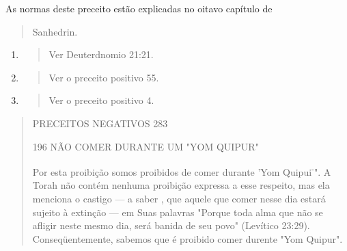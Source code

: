 As normas deste preceito estão explicadas no oitavo capítulo de

\begin{quote}
Sanhedrin.
\end{quote}

\begin{enumerate}
\def\labelenumi{\arabic{enumi}.}
\setcounter{enumi}{365}
\item
  \begin{quote}
  Ver Deuterdnomio 21:21.
  \end{quote}
\item
  \begin{quote}
  Ver o preceito positivo 55.
  \end{quote}
\item
  \begin{quote}
  Ver o preceito positivo 4.
  \end{quote}
\end{enumerate}

\begin{quote}
PRECEITOS NEGATIVOS 283

196 NÃO COMER DURANTE UM "YOM QUIPUR"

Por esta proibição somos proibidos de comer durante 'Yom
Qui­pui\textsuperscript{-}". A Torah não contém nenhuma proibição
expressa a esse respeito, mas ela menciona o castigo --- a saber , que
aquele que comer nesse dia estará sujei­to à extinção --- em Suas
palavras "Porque toda alma que não se afligir neste mesmo dia, será
banida de seu povo" (Levítico 23:29). Conseqüentemente, sa­bemos que é
proibido comer durente "Yom Quipur".
\end{quote}

